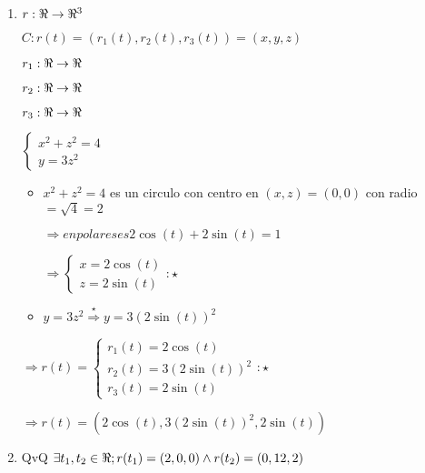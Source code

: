 \documentclass[../parcial.tex]{subfiles}
\begin{document}
    \begin{enumerate}
        \item 

            $r: \real \to \real^3 $

            $C: r(t) = (r_1(t), r_2(t), r_3(t)) = (x,y,z)$

            $r_1: \real \to \real $

            $r_2: \real \to \real $

            $r_3: \real \to \real $

            $\left\{
                \begin{array}{ll}
                    x^2 + z^2 = 4\\
                    y = 3z^2
                \end{array}
            \right.$

            \begin{itemize}
                \item $x^2 + z^2 = 4$ es un circulo con centro en $(x,z) = (0,0)$  con radio $= \sqrt{4} = 2$
                
                    $\Rightarrow en polares es 2\cos(t) + 2\sin(t) = 1 $

                    $\Rightarrow\left\{
                        \begin{array}{ll}
                            x = 2\cos(t)\\
                            z = 2\sin(t)
                        \end{array}
                    \right. :\star$

                \item $ y = 3z^2 \stackrel{\star}{\Rightarrow} y = 3(2\sin(t))^2 $
            \end{itemize}

            $\Rightarrow r(t) = \left\{
                \begin{array}{ll}
                    r_1(t) = 2\cos(t) \\
                    r_2(t) = 3(2\sin(t))^2 \\
                    r_3(t) = 2\sin(t)
                \end{array}
            \right. :\star$
            
            $\Rightarrow r(t) = (2\cos(t),3(2\sin(t))^2, 2\sin(t))$

        \item QvQ $ \exists t_1,t_2 \in \real ; r(t_1) = (2,0,0) \wedge r(t_2)=(0,12,2) $
        

\end{enumerate}
\end{document}
